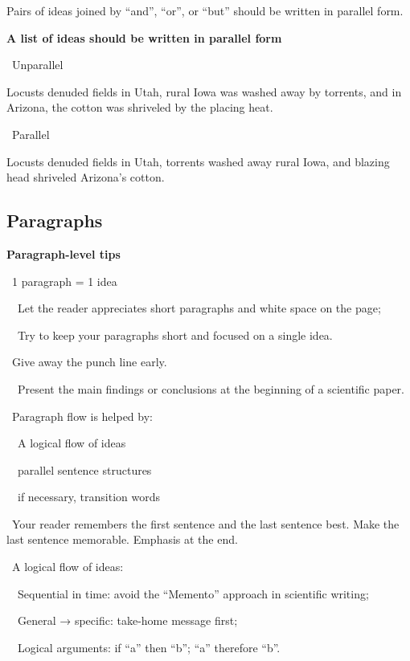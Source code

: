 \documentclass[a4paper, 12pt]{article}
\begin{document}
Pairs of ideas joined by ``and'', ``or'', or ``but'' should be written in parallel form.

\textbf{A list of ideas should be written in parallel form}
\par\textbullet\ Unparallel
\par Locusts denuded fields in Utah, rural Iowa was washed away by torrents, and in Arizona, the cotton was shriveled by the placing heat.

\par\textbullet\ Parallel
\par Locusts denuded fields in Utah, torrents washed away rural Iowa, and blazing head shriveled Arizona's cotton.

\newpage\subsection{Paragraphs}

\textbf{Paragraph-level tips}

\par\textbullet\ 1 paragraph = 1 idea
\par\ \textopenbullet\ Let the reader appreciates short paragraphs and white space on the page;
\par\ \textopenbullet\ Try to keep your paragraphs short and focused on a single idea.

\par\textbullet\ Give away the punch line early.
\par\ \textopenbullet\ Present the main findings or conclusions at the beginning of a scientific paper.

\par\textbullet\ Paragraph flow is helped by:
\par\ \textopenbullet\ A logical flow of ideas
\par\ \textopenbullet\ parallel sentence structures
\par\ \textopenbullet\ if necessary, transition words

\par\textbullet\ Your reader remembers the first sentence and the last sentence best. Make the last sentence memorable. Emphasis at the end.

\par\textbullet\ A logical flow of ideas:
\par\ \textopenbullet\ Sequential in time: avoid the ``Memento'' approach in scientific writing;
\par\ \textopenbullet\ General → specific: take-home message first;
\par\ \textopenbullet\ Logical arguments: if ``a'' then ``b''; ``a'' therefore ``b''.
\end{document}
